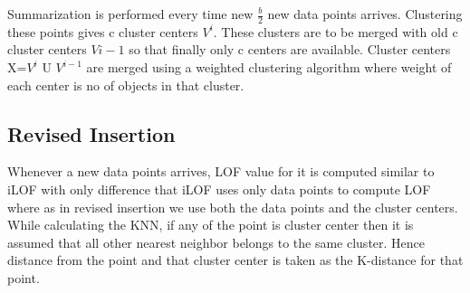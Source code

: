 Summarization is performed every time new $\frac{b}{2}$ new data points arrives. Clustering these points gives c cluster centers $V^i$. These clusters are to be merged with old c cluster centers $V{i-1}$ so that finally only c centers are available. Cluster centers X={$V^i$ U $V^{i-1}$} are merged using a weighted clustering algorithm where weight of each center is no of objects in that cluster. 


\subsection{Revised Insertion}
Whenever a new data points arrives, LOF value for it is computed similar to iLOF with only difference that iLOF uses only data points to compute LOF where as in revised insertion we use both the data points and the cluster centers. While calculating the KNN, if any of the point is cluster center then it is assumed that all other nearest neighbor belongs to the same cluster. Hence distance from the point and that cluster center is taken as the K-distance for that point.  





